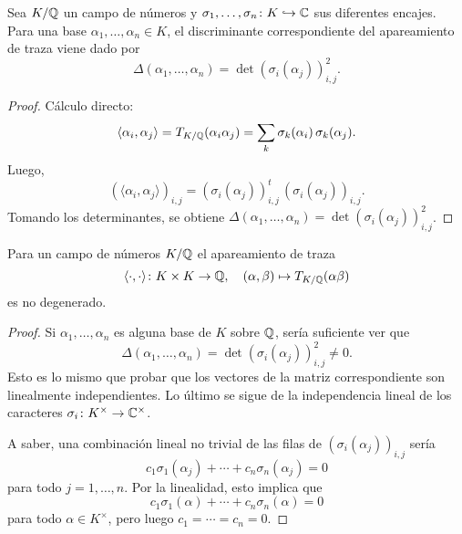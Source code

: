 \begin{lema}
  \label{lema:discriminante-en-terminos-de-encajes}
  Sea $K/\mathbb{Q}$ un campo de números y
  $\sigma_1,\ldots,\sigma_n\colon K \hookrightarrow \mathbb{C}$ sus diferentes encajes.
  Para una base $\alpha_1,\ldots,\alpha_n \in K$, el discriminante
  correspondiente del apareamiento de traza viene dado por
  $$\Delta (\alpha_1,\ldots,\alpha_n) = \det (\sigma_i (\alpha_j))_{i,j}^2.$$

  \begin{proof}
    Cálculo directo:
    \[ \langle\alpha_i,\alpha_j\rangle = T_{K/\mathbb{Q}} (\alpha_i \alpha_j) =
       \sum_k \sigma_k (\alpha_i)\,\sigma_k (\alpha_j). \]
    Luego,
    \[ (\langle\alpha_i,\alpha_j\rangle)_{i,j} =
       (\sigma_i (\alpha_j))_{i,j}^t\,(\sigma_i (\alpha_j))_{i,j}. \]
    Tomando los determinantes, se obtiene
    $\Delta (\alpha_1,\ldots,\alpha_n) = \det (\sigma_i (\alpha_j))_{i,j}^2$.
  \end{proof}
\end{lema}

\begin{proposicion}
  Para un campo de números $K/\mathbb{Q}$ el apareamiento de traza
  \[ \langle\cdot,\cdot\rangle\colon K\times K \to \mathbb{Q}, \quad
     (\alpha,\beta) \mapsto T_{K/\mathbb{Q}} (\alpha\beta) \]
  es no degenerado.

  \begin{proof}
    Si $\alpha_1,\ldots,\alpha_n$ es alguna base de $K$ sobre $\mathbb{Q}$,
    sería suficiente ver que
    \[ \Delta (\alpha_1,\ldots,\alpha_n) =
       \det (\sigma_i (\alpha_j))_{i,j}^2 \ne 0. \]
    Esto es lo mismo que probar que los vectores de la matriz correspondiente
    son linealmente independientes. Lo último se sigue de la independencia
    lineal de los caracteres $\sigma_i\colon K^\times \to \mathbb{C}^\times$.

    A saber, una combinación lineal no trivial de las filas de
    $(\sigma_i (\alpha_j))_{i,j}$ sería
    $$c_1 \sigma_1 (\alpha_j) + \cdots + c_n \sigma_n (\alpha_j) = 0$$
    para todo $j = 1,\ldots,n$. Por la linealidad, esto implica que
    $$c_1 \sigma_1 (\alpha) + \cdots + c_n \sigma_n (\alpha) = 0$$
    para todo $\alpha \in K^\times$, pero luego
    $c_1 = \cdots = c_n = 0$.
  \end{proof}
\end{proposicion}

